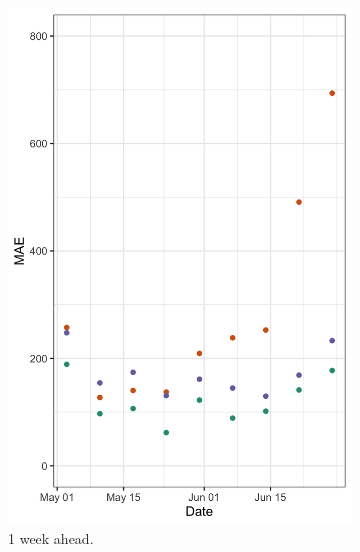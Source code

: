 \documentclass{umassthesis}          %
\begin{document}
\begin{figure}
  \centering
     \begin{subfigure}{.5\textwidth}
  \centering
    \includegraphics[scale=.15]{ablation_1.png}
    \caption{1 week ahead.}
\end{subfigure}%
\begin{subfigure}{.5\textwidth}
  \centering

\end{subfigure}
\end{figure}
\end{document}

